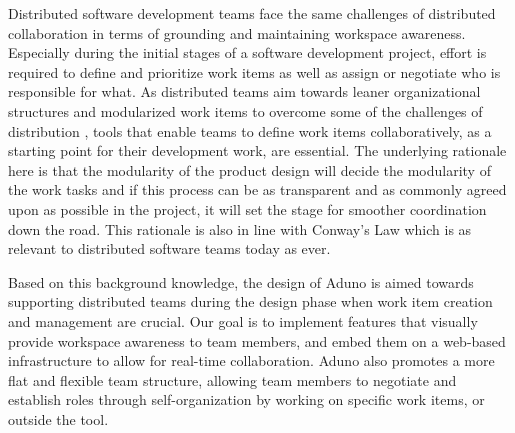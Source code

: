 \documentclass[conference]{IEEEtran}
\begin{document}
Distributed software development teams face the same challenges of distributed collaboration in terms of grounding and maintaining workspace awareness. Especially during the initial stages of a software development project, effort is required to define and prioritize work items as well as assign or negotiate who is responsible for what. As distributed teams aim towards leaner organizational structures and modularized work items to overcome some of the challenges of distribution \cite{Herbsleb07, HG99, Parnas72}, tools that enable teams to define work items collaboratively, as a starting point for their development work, are essential. The underlying rationale here is that the modularity of the product design will decide the modularity of the work tasks and if this process can be as transparent and as commonly agreed upon as possible in the project, it will set the stage for smoother coordination down the road. This rationale is also in line with Conway's Law \cite{Conway68} which is as relevant to distributed software teams today as ever.

Based on this background knowledge, the design of Aduno is aimed towards supporting distributed teams during the design phase when work item creation and management are crucial. Our goal is to implement features that visually provide workspace awareness to team members, and embed them on a web-based infrastructure to allow for real-time collaboration. Aduno also promotes a more flat and flexible team structure, allowing team members to negotiate and establish roles through self-organization by working on specific work items, or outside the tool.
\end{document}
